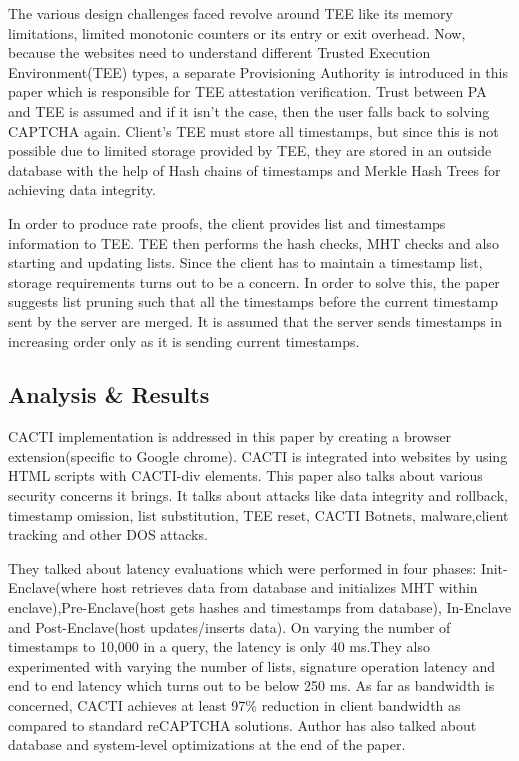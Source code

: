 \documentclass[runningheads,10pt]{llncs}
\begin{document}
	The various design challenges faced revolve around TEE like its memory limitations, limited monotonic counters or its entry or exit overhead. Now, because the websites need to understand different Trusted Execution Environment(TEE) types, a separate Provisioning Authority is introduced in this paper which is responsible for TEE attestation verification. Trust between PA and TEE is assumed and if it isn’t the case, then the user falls back to solving CAPTCHA again. Client’s TEE must store all timestamps, but since this is not possible due to limited storage provided by TEE, they are stored in an outside database with the help of Hash chains of timestamps and Merkle Hash Trees for achieving data integrity.

	In order to produce rate proofs, the client provides list and timestamps information to TEE. TEE then performs the hash checks, MHT checks and also starting and updating lists. Since the client has to maintain a timestamp list, storage requirements turns out to be a concern. In order to solve this, the paper suggests list pruning such that all the timestamps before the current timestamp sent by the server are merged. It is assumed that the server sends timestamps in increasing order only as it is sending current timestamps.

	\subsection{Analysis \& Results}

	CACTI implementation is addressed in this paper by creating a browser extension(specific to Google chrome). CACTI is integrated into websites by using HTML scripts with CACTI-div elements. This paper also talks about various security concerns it brings. It talks about attacks like data integrity and rollback, timestamp omission, list substitution, TEE reset, CACTI Botnets, malware,client tracking and other DOS attacks.

	They talked about latency evaluations which were performed in four phases: Init-Enclave(where host retrieves data from database and initializes MHT within enclave),Pre-Enclave(host gets hashes and timestamps from database), In-Enclave and Post-Enclave(host updates/inserts data). On varying the number of timestamps to 10,000 in a query, the latency is only 40 ms.They also experimented with varying the number of lists, signature operation latency and end to end latency which turns out to be below 250 ms. As far as bandwidth is concerned, CACTI achieves at least 97\% reduction in client bandwidth as compared to standard reCAPTCHA solutions. Author has also talked about database and system-level optimizations at the end of the paper.
\end{document}
